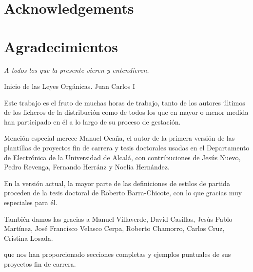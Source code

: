 \documentclass[spanish,openright]{book}
\newenvironment{FraseCelebre}{\begin{list}{}{\setlength{\leftmargin}{0.5\textwidth}\setlength{\parsep}{0cm}\addtolength{\topsep}{0.5cm}}
  }
  {\unskip \end{list}}
\newenvironment{Frase}{\item \begin{flushright}\small\em}{\end{flushright}}
\newenvironment{Fuente}{\item \begin{flushright}\small}{\end{flushright}}
\newcommand{\myLanguage}{spanish}
\begin{document}
\vspace{4cm}
\vspace*{\fill}





 

\thispagestyle{empty}

\ifthenelse{\equal{\myLanguage}{english}}
{
  \chapter*{Acknowledgements}
  \label{cha:acknowledgements}
}
{
  \chapter*{Agradecimientos}
  \label{cha:agradecimientos}
}




\begin{FraseCelebre}
  \begin{Frase}
    A todos los que la presente vieren y entendieren.
  \end{Frase}
  \begin{Fuente}
    Inicio de las Leyes Orgánicas. Juan Carlos I
  \end{Fuente}
\end{FraseCelebre}




Este trabajo es el fruto de muchas horas de trabajo, tanto de los
autores últimos de los ficheros de la distribución como de todos los que
en mayor o menor medida han participado en él a lo largo de su proceso
de gestación.

Mención especial merece Manuel Ocaña, el autor de la primera versión de
las plantillas de proyectos fin de carrera y tesis doctorales usadas en
el Departamento de Electrónica de la Universidad de Alcalá, con
contribuciones de Jesús Nuevo, Pedro Revenga, Fernando Herránz y Noelia
Hernández.

En la versión actual, la mayor parte de las definiciones de estilos de
partida proceden de la tesis doctoral de Roberto Barra-Chicote, con lo
que gracias muy especiales para él.

También damos las gracias a Manuel Villaverde, David Casillas, Jesús Pablo Martínez, José Francisco Velasco Cerpa, Roberto Chamorro, Carlos Cruz, Cristina Losada.

  que nos
han proporcionado secciones completas y ejemplos puntuales de sus
proyectos fin de carrera.
\end{document}
